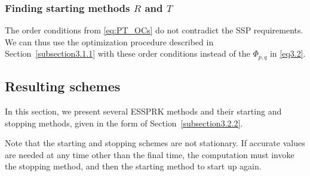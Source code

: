 

\subsubsection{Finding starting methods $ R $ and $ T $}\label{subsection3.2.3}


The order conditions from \eqref{eq:PT_OCs} do not contradict the SSP
requirements.  We can thus use the optimization procedure described in
Section~\ref{subsection3.1.1} with these order conditions instead of
the $\Phi_{p,q}$ in \eqref{eq3.2}.  


\subsection{Resulting schemes}

In this section, we present several ESSPRK methods and their starting
and stopping methods, given in the form of
Section~\ref{subsection3.2.2}.

Note that the starting and stopping schemes are not stationary.  If
accurate values are needed at any time other than the final time, the
computation must invoke the stopping method, and then the starting method to start up again. 

